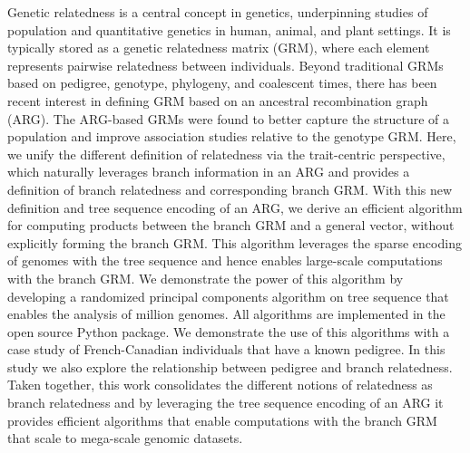 Genetic relatedness is a central concept in genetics,
underpinning studies of population and quantitative genetics in human, animal, and plant settings.
%
It is typically stored as a genetic relatedness matrix (GRM),
where each element represents pairwise relatedness between individuals.
%
Beyond traditional GRMs based on pedigree, genotype, phylogeny, and coalescent times,
there has been recent interest in defining GRM based on an ancestral recombination graph (ARG).
%
The ARG-based GRMs were found to better capture the structure of a population and
improve association studies relative to the genotype GRM.
%
Here, we unify the different definition of relatedness via the trait-centric perspective,
which naturally leverages branch information in an ARG and 
provides a definition of branch relatedness and corresponding branch GRM.
%
With this new definition and tree sequence encoding of an ARG,
we derive an efficient algorithm for computing products between the branch GRM and a general vector,
without explicitly forming the branch GRM.
%
This algorithm leverages the sparse encoding of genomes with the tree sequence and
hence enables large-scale computations with the branch GRM.
%
We demonstrate the power of this algorithm by developing
a randomized principal components algorithm on tree sequence
that enables the analysis of million genomes.
%
All algorithms are implemented in the open source \tskit{} Python package.
%
We demonstrate the use of this algorithms with a case study of French-Canadian individuals
that have a known pedigree.
%
In this study we also explore the relationship between pedigree and branch relatedness.
%
Taken together, this work consolidates the different notions of relatedness as branch relatedness
and by leveraging the tree sequence encoding of an ARG it provides efficient algorithms
that enable computations with the branch GRM that scale to mega-scale genomic datasets.